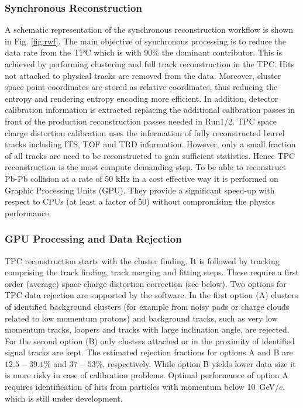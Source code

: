 \begin{figure*}[hbtp]
 \begin{center}
 \end{center}
 \caption{Synchronous Reconstruction Workflow}
 \label{fig:rwf}
 \end{figure*}
\subsubsection{Synchronous Reconstruction}
A schematic representation of the synchronous reconstruction workflow is shown in Fig. \ref{fig:rwf}.
The main objective of synchronous processing is to reduce the data rate from the TPC which is with 90\%
the dominant contributor. This is achieved by performing clustering and full track reconstruction in the
TPC. Hits not attached to physical tracks are removed from the data. Moreover, cluster space point 
coordinates are stored as relative coordinates, thus reducing the entropy and rendering entropy encoding
more efficient. In addition, detector calibration information is extracted replacing the additional 
calibration passes in front of the production reconstruction passes needed in Run1/2. TPC space charge 
distortion calibration uses the information of fully reconstructed barrel tracks including ITS, TOF and
TRD information. However, only a small fraction of all tracks are need to be reconstructed to gain 
sufficient statistics. Hence TPC reconstruction is the most compute demanding step. To be able to 
reconstruct Pb-Pb collision at a rate of 50 kHz in a cost 
effective way it is performed on Graphic Processing Units (GPU). They provide a significant speed-up 
with respect to CPUs (at least a factor of 50) without compromising the physics performance.

\subsubsection*{GPU Processing and Data Rejection}
TPC reconstruction starts with the cluster finding. It is followed by tracking comprising the track 
finding, track merging and fitting steps. These require a first order (average) space charge distortion
correction (see below). Two options for TPC data rejection are supported by the software. In the first 
option (A) clusters of identified background clusters (for example from noisy pads or charge clouds 
related to low momentum protons) and background tracks, such as very low momentum tracks, loopers and 
tracks with large inclination angle, are rejected.  For the second option (B) only clusters attached or
in the proximity of identified signal tracks are kept.
The estimated rejection fractions for options A and B are $12.5-39.1\%$ and $37-53\%$, respectively. 
While option B yields lower data size it is more risky in case of calibration problems. Optimal 
performance of option A requires identification of hits from particles with momentum below 10~GeV/$c$, 
which is still under development.

